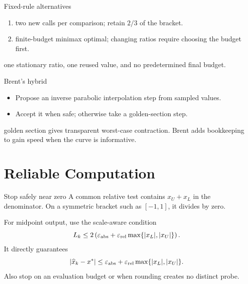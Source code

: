 \documentclass[aspectratio=169,11pt,t]{beamer}
\begin{document}
\begin{frame}{Fixed-rule alternatives}
  \begin{enumerate}
    \item {} two new calls per comparison; retain
      \(2/3\) of the bracket.
    \item {} finite-budget minimax optimal; changing
      ratios require choosing the budget first.
  \end{enumerate}

  \vspace{0.12cm}
   one stationary ratio, one reused value,
  and no predetermined final budget.
\end{frame}

\begin{frame}{Brent's hybrid}
  \begin{itemize}
    \item Propose an inverse parabolic interpolation step from sampled values.
    \item Accept it when safe; otherwise take a golden-section step.
  \end{itemize}

  \vspace{0.14cm}
   golden section gives transparent worst-case contraction.
  Brent adds bookkeeping to gain speed when the curve is informative.
\end{frame}

\section{Reliable Computation}

\begin{frame}{Stop safely near zero}
  A common relative test contains \(x_U+x_L\) in the denominator. On a
  symmetric bracket such as \([-1,1]\), it divides by zero.

  \vspace{0.20cm}
  For midpoint output, use the scale-aware condition
  \[
    L_k\le 2\left(\varepsilon_{\rm abs}
      +\varepsilon_{\rm rel}\max\{|x_L|,|x_U|\}\right).
  \]
  It directly guarantees
  \[
    |\widehat{x}_k-x^*|\le
    \varepsilon_{\rm abs}+\varepsilon_{\rm rel}\max\{|x_L|,|x_U|\}.
  \]
  Also stop on an evaluation budget or when rounding creates no distinct probe.
\end{frame}
\end{document}
